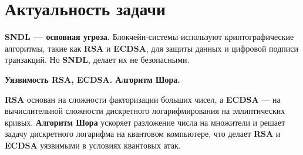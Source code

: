 \documentclass[a4paper]{article}
\begin{document}
\section{Актуальность задачи}

\noindent\textbf{SNDL — основная угроза.}  
Блокчейн-системы используют криптографические алгоритмы, такие как \textbf{RSA} и \textbf{ECDSA}, для защиты данных и цифровой подписи транзакций. Но \textbf{SNDL}, делает их не безопасными.






%
\noindent\textbf{Уязвимость RSA, ECDSA. Алгоритм Шора.}  

\textbf{RSA} основан на сложности факторизации больших чисел, а \textbf{ECDSA} — на вычислительной сложности дискретного логарифмирования на эллиптических кривых. 
\textbf{Алгоритм Шора} ускоряет разложение числа на множители и решает задачу дискретного логарифма на квантовом компьютере, что делает \textbf{RSA} и \textbf{ECDSA} уязвимыми в условиях квантовых атак.
\end{document}

